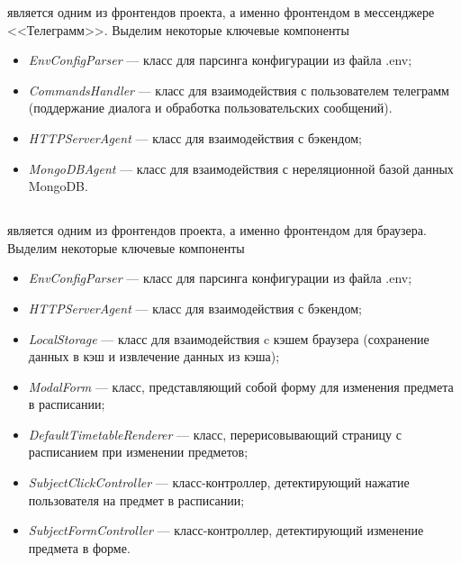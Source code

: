 			\Botbf{} является одним из фронтендов проекта, а именно фронтендом в мессенджере <<Телеграмм>>. Выделим некоторые ключевые компоненты
			\begin{itemize}
				\item \textit{EnvConfigParser} --- класс для парсинга конфигурации из файла .env;
				
				\item \textit{CommandsHandler} --- класс для взаимодействия с пользователем телеграмм (поддержание диалога и обработка пользовательских сообщений).
				
				\item \textit{HTTPServerAgent} --- класс для взаимодействия с бэкендом;
				
				\item \textit{MongoDBAgent} --- класс для взаимодействия с нереляционной базой данных MongoDB.
			\end{itemize}
		\subsection{\Extension{}}
			\begin{figure}[H]
				\centering
				\def\svgwidth{\columnwidth}
				
			\end{figure}
			
			\Extensionbf{} является одним из фронтендов проекта, а именно фронтендом для браузера. Выделим некоторые ключевые компоненты
			\begin{itemize}
				\item \textit{EnvConfigParser} --- класс для парсинга конфигурации из файла .env;
			
				\item \textit{HTTPServerAgent} --- класс для взаимодействия с бэкендом;
				
				\item \textit{LocalStorage} --- класс для взаимодействия c кэшем браузера (сохранение данных в кэш и извлечение данных из кэша);
			
				\item \textit{ModalForm} --- класс, представляющий собой форму для изменения предмета в расписании;
				
				\item \textit{DefaultTimetableRenderer} --- класс, перерисовывающий страницу с расписанием при изменении предметов;
				
				\item \textit{SubjectClickController} --- класс-контроллер, детектирующий нажатие пользователя на предмет в расписании;
				
				\item \textit{SubjectFormController} --- класс-контроллер, детектирующий изменение предмета в форме.
			\end{itemize}
